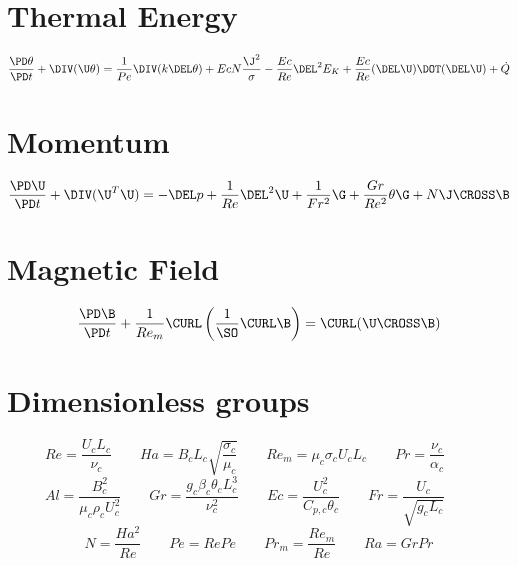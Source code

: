\documentclass[11pt]{article}
\begin{document}
\doublespacing
\MOONSTITLE

\section{Thermal Energy}
\Large
\begin{equation}
	\frac{\PD \theta}{\PD t}
	+ \DIV (\U \theta)
	=
	\frac{1}{Pe} \DIV (k \DEL \theta)
	+ Ec N \frac{{\J}^2}{\sigma}
	- \frac{Ec}{Re} \DEL^2 E_K
	+ \frac{Ec}{Re} (\DEL \U) \DOT (\DEL \U)
	+ \dot{Q}
\end{equation}
\section{Momentum}
\begin{equation}
	\frac{\PD \U}{\PD t}
	+ \DIV (\U^T \U)
	=
	- \DEL p
	+ \frac{1}{Re} \DEL^2 \U
	+ \frac{1}{Fr^2} \G
	+ \frac{Gr}{Re^2} \theta \G
	+ N \J \CROSS \B
\end{equation}
\section{Magnetic Field}
\begin{equation}
	\frac{\PD \B}{\PD t}
	+ \frac{1}{Re_m} \CURL \left(\frac{1}{\SO} \CURL \B \right)
	= \CURL (\U \CROSS \B)
\end{equation}

\section{Dimensionless groups}
\begin{equation}
	Re = \frac{U_c L_c}{\nu_c} \qquad
	Ha = B_c L_c \sqrt{\frac{\sigma_c}{\mu_c}} \qquad
	Re_m = \mu_c \sigma_c U_c L_c \qquad
	Pr = \frac{\nu_c}{\alpha_c} \qquad
\end{equation}
\begin{equation}
	Al = \frac{B_c^2}{\mu_c \rho_c U_c^2} \qquad
	Gr = \frac{g_c \beta_c \theta_c L_c^3}{\nu_c^2} \qquad
	Ec = \frac{U_c^2}{C_{p,c} \theta_c} \qquad
	Fr = \frac{U_c}{\sqrt{g_c L_c}} \qquad
\end{equation}
\begin{equation}
	N = \frac{Ha^2}{Re} \qquad
	Pe = Re Pe \qquad
	Pr_{m} = \frac{Re_m}{Re} \qquad
	Ra = Gr Pr
\end{equation}
\end{document}
